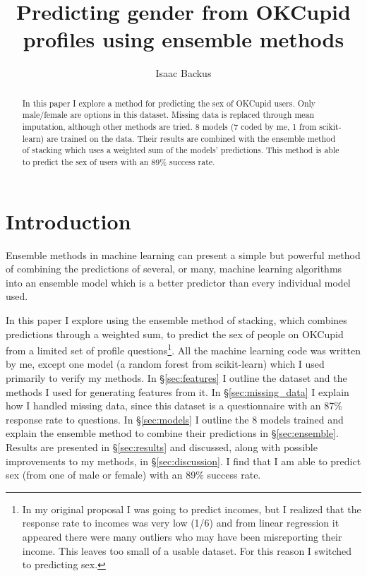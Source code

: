 \documentclass{article} %
\title{Predicting gender from OKCupid profiles using ensemble methods}
\author{Isaac Backus}
\begin{document}
\maketitle

\begin{abstract}
In this paper I explore a method for predicting the sex of OKCupid users.  Only male/female are options in this dataset.  Missing data is replaced through mean imputation, although other methods are tried.  8 models (7 coded by me, 1 from scikit-learn) are trained on the data.  Their results are combined with the ensemble method of stacking which uses a weighted sum of the models' predictions.  This method is able to predict the sex of users with an 89\% success rate.
\end{abstract}

\section{Introduction}
\label{sec:introduction}
Ensemble methods in machine learning can present a simple but powerful method of combining the predictions of several, or many, machine learning algorithms into an ensemble model which is a better predictor than every individual model used.

In this paper I explore using the ensemble method of stacking, which combines predictions through a weighted sum, to predict the sex of people on OKCupid from a limited set of profile questions\footnote{In my original proposal I was going to predict incomes, but I realized that the response rate to incomes was very low (1/6) and from linear regression it appeared there were many outliers who may have been misreporting their income.  This leaves too small of a usable dataset.  For this reason I switched to predicting sex.}.  All the machine learning code was written by me, except one model (a random forest from scikit-learn) which I used primarily to verify my methods.  In \S\ref{sec:features} I outline the dataset and the methods I used for generating features from it.  In \S\ref{sec:missing_data} I explain how I handled missing data, since this dataset is a questionnaire with an 87\% response rate to questions.  In \S\ref{sec:models} I outline the 8 models trained and explain the ensemble method to combine their predictions in \S\ref{sec:ensemble}.  Results are presented in \S\ref{sec:results} and discussed, along with possible improvements to my methods, in \S\ref{sec:discussion}.  I find that I am able to predict sex (from one of male or female) with an 89\% success rate.
\end{document}
